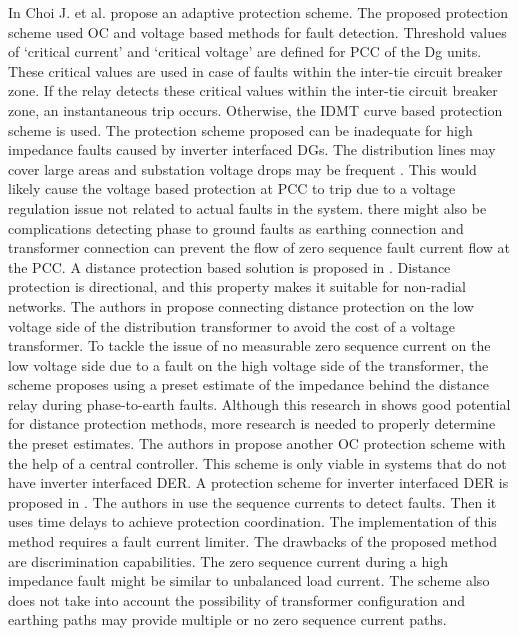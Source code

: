  In \cite{PR139} Choi J. et al. propose an adaptive protection scheme. The proposed protection scheme used OC and voltage based methods for fault detection. Threshold values of ‘critical current’ and ‘critical voltage’ are defined for PCC of the Dg units. These critical values are used in case of faults within the inter-tie circuit breaker zone. If the relay detects these critical values within the inter-tie circuit breaker zone, an instantaneous trip occurs. Otherwise, the IDMT curve based protection scheme is used. The protection scheme proposed can be inadequate for high impedance faults caused by inverter interfaced DGs. The distribution lines may cover large areas and substation voltage drops may be frequent \cite{PR137}. This would likely cause the voltage based protection at PCC to trip due to a voltage regulation issue not related to actual faults in the system. there might also be complications detecting phase to ground faults as earthing connection and transformer connection can prevent the flow of zero sequence fault current flow at the PCC.
A distance protection based solution is proposed in \cite{PR140}. Distance protection is directional, and this property makes it suitable for non-radial networks. The authors in \cite{PR140} propose connecting distance protection on the low voltage side of the distribution transformer to avoid the cost of a voltage transformer. To tackle the issue of no measurable zero sequence current on the low voltage side due to a fault on the high voltage side of the transformer, the scheme proposes using a preset estimate of the impedance behind the distance relay during phase-to-earth faults. Although this research in \cite{PR140} shows good potential for distance protection methods, more research is needed to properly determine the preset estimates.
The authors in \cite{PR140} propose another OC protection scheme with the help of a central controller. This scheme is only viable in systems that do not have inverter interfaced DER.
A protection scheme for inverter interfaced DER is proposed in \cite{PR142}. The authors in \cite{PR142} use the sequence currents to detect faults. Then it uses time delays to achieve protection coordination. The implementation of this method requires a fault current limiter. The drawbacks of the proposed method are discrimination capabilities. The zero sequence current during a high impedance fault might be similar to unbalanced load current. The scheme also does not take into account the possibility of transformer configuration and earthing paths may provide multiple or no zero sequence current paths.
